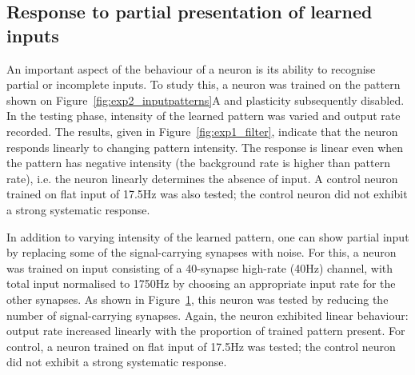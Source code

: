 \documentclass[a4paper,12pt]{report}
\theoremstyle{definition}
\begin{document}
\begin{figure}[!htb]
\begin{minipage}[t]{.5\textwidth}
  \captionsetup{width=0.95\linewidth}
  \label{fig:exp5_patterncompletion}
\end{minipage}
\end{figure}







\subsection{Response to partial presentation of learned inputs}
\label{subsec:partialpatterns}


An important aspect of the behaviour of a neuron is its ability to recognise partial or incomplete inputs. To study this, a neuron was trained on the pattern shown on Figure~\ref{fig:exp2_inputpatterns}A and plasticity subsequently disabled. In the testing phase, intensity of the learned pattern was varied and output rate recorded. The results, given in Figure~\ref{fig:exp1_filter}, indicate that the neuron responds linearly to changing pattern intensity. The response is linear even when the pattern has negative intensity (the background rate is higher than pattern rate), i.e. the neuron linearly determines the absence of input. A control neuron trained on flat input of 17.5Hz was also tested; the control neuron did not exhibit a strong systematic response.



In addition to varying intensity of the learned pattern, one can show partial input by replacing some of the signal-carrying synapses with noise. For this, a neuron was trained on input consisting of a 40-synapse high-rate (40Hz) channel, with total input normalised to 1750Hz by choosing an appropriate input rate for the other synapses. As shown in Figure~\ref{fig:exp5_patterncompletion}, this neuron was tested by reducing the number of signal-carrying synapses. Again, the neuron exhibited linear behaviour: output rate increased linearly with the proportion of trained pattern present. For control, a neuron trained on flat input of 17.5Hz was tested; the control neuron did not exhibit a strong systematic response.
\end{document}
